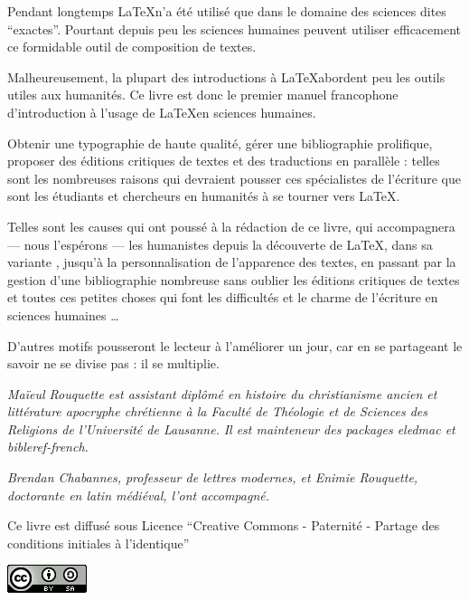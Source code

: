 \thispagestyle{empty}

Pendant longtemps \LaTeX n'a été utilisé que dans le domaine des sciences dites \enquote{exactes}.
Pourtant depuis peu les sciences humaines peuvent utiliser efficacement ce formidable outil de composition de textes.


Malheureusement, la plupart des introductions à \LaTeX abordent peu les outils utiles aux humanités. Ce livre est donc le premier manuel francophone d'introduction à l'usage de \LaTeX en sciences humaines.

Obtenir une typographie de haute qualité, gérer une bibliographie prolifique, proposer des éditions critiques de textes et des traductions en parallèle : telles sont les nombreuses raisons qui devraient pousser ces spécialistes de l'écriture que sont les étudiants et chercheurs en humanités à se tourner vers \LaTeX.

Telles sont les causes qui ont poussé à la rédaction de ce livre, qui accompagnera --- nous l'espérons --- les humanistes depuis la découverte de \LaTeX, dans sa variante \XeLaTeX, jusqu'à la personnalisation de l'apparence des textes, en passant par la gestion d'une bibliographie nombreuse sans oublier les éditions critiques de textes et toutes ces petites choses qui font les difficultés et le charme de l'écriture en sciences humaines \ldots

D'autres motifs pousseront le lecteur à l'améliorer un jour, car en se partageant le savoir ne se divise pas : il se multiplie.

\vspace{4ex}

\scriptsize
\emph{
Maïeul Rouquette est assistant diplômé en histoire du christianisme ancien et littérature apocryphe chrétienne à la Faculté de Théologie et de Sciences des Religions de l'Université de Lausanne.} 
\emph{Il est mainteneur des packages \emph{eledmac} et \emph{bibleref-french}.}


\emph{Brendan Chabannes, professeur de lettres modernes, et Enimie Rouquette, doctorante en latin médiéval, l'ont accompagné.}

\normalsize

\vspace{4ex}
Ce livre est diffusé sous Licence \enquote{Creative Commons - Paternité - Partage des conditions initiales à l'identique}

\vspace{2ex}
 \raggedleft\includegraphics[height=3ex]{images/cc.png}
